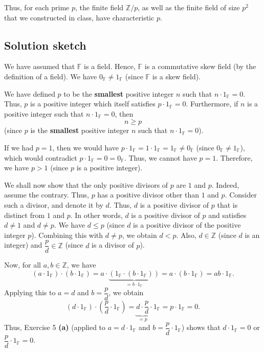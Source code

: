 \documentclass[paper=a4, fontsize=12pt]{scrartcl}%
\theoremstyle{plainsl}
\theoremstyle{definition}
\theoremstyle{remark}
\begin{document}
Thus, for each prime $p$, the finite field $\mathbb{Z} / p$, as well as the
finite field of size $p^{2}$ that we constructed in class, have characteristic
$p$.

\subsection{Solution sketch}

We have assumed that $\mathbb{F}$ is a field. Hence, $\mathbb{F}$ is a
commutative skew field (by the definition of a field). We have $0_{\mathbb{F}%
}\neq1_{\mathbb{F}}$ (since $\mathbb{F}$ is a skew field).

We have defined $p$ to be the \textbf{smallest} positive integer $n$ such that
$n\cdot1_{\mathbb{F}}=0$. Thus, $p$ is a positive integer which itself
satisfies $p\cdot1_{\mathbb{F}}=0$. Furthermore, if $n$ is a positive integer
such that $n\cdot1_{\mathbb{F}}=0$, then%
\begin{equation}
n\geq p \label{sol.field.char.prime.1}%
\end{equation}
(since $p$ is the \textbf{smallest} positive integer $n$ such that
$n\cdot1_{\mathbb{F}}=0$).

If we had $p=1$, then we would have $p\cdot1_{\mathbb{F}}=1\cdot1_{\mathbb{F}%
}=1_{\mathbb{F}}\neq0_{\mathbb{F}}$ (since $0_{\mathbb{F}}\neq1_{\mathbb{F}}%
$), which would contradict $p\cdot1_{\mathbb{F}}=0=0_{\mathbb{F}}$. Thus, we
cannot have $p=1$. Therefore, we have $p>1$ (since $p$ is a positive integer).

We shall now show that the only positive divisors of $p$ are $1$ and $p$.
Indeed, assume the contrary. Thus, $p$ has a positive divisor other than $1$
and $p$. Consider such a divisor, and denote it by $d$. Thus, $d$ is a
positive divisor of $p$ that is distinct from $1$ and $p$. In other words, $d$
is a positive divisor of $p$ and satisfies $d\neq1$ and $d\neq p$. We have
$d\leq p$ (since $d$ is a positive divisor of the positive integer $p$).
Combining this with $d\neq p$, we obtain $d<p$. Also, $d\in\mathbb{Z}$ (since
$d$ is an integer) and $\dfrac{p}{d}\in\mathbb{Z}$ (since $d$ is a divisor of
$p$).

Now, for all $a,b\in\mathbb{Z}$, we have%
\[
\left(  a\cdot1_{\mathbb{F}}\right)  \cdot\left(  b\cdot1_{\mathbb{F}}\right)
=a\cdot\underbrace{\left(  1_{\mathbb{F}}\cdot\left(  b\cdot1_{\mathbb{F}%
}\right)  \right)  }_{=b\cdot1_{\mathbb{F}}}=a\cdot\left(  b\cdot
1_{\mathbb{F}}\right)  =ab\cdot1_{\mathbb{F}}.
\]
Applying this to $a=d$ and $b=\dfrac{p}{d}$, we obtain%
\[
\left(  d\cdot1_{\mathbb{F}}\right)  \cdot\left(  \dfrac{p}{d}\cdot
1_{\mathbb{F}}\right)  =\underbrace{d\cdot\dfrac{p}{d}}_{=p}\cdot
1_{\mathbb{F}}=p\cdot1_{\mathbb{F}}=0.
\]
Thus, Exercise 5 \textbf{(a)} (applied to $a=d\cdot1_{\mathbb{F}}$ and
$b=\dfrac{p}{d}\cdot1_{\mathbb{F}}$) shows that $d\cdot1_{\mathbb{F}}=0$ or
$\dfrac{p}{d}\cdot1_{\mathbb{F}}=0$.
\end{document}
